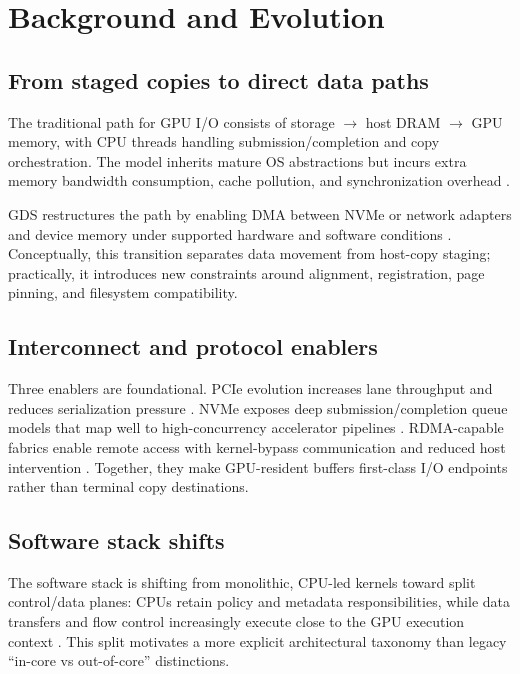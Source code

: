\section{Background and Evolution}

\subsection{From staged copies to direct data paths}

The traditional path for GPU I/O consists of storage $\rightarrow$ host DRAM $\rightarrow$ GPU memory, with CPU threads handling submission/completion and copy orchestration. The model inherits mature OS abstractions but incurs extra memory bandwidth consumption, cache pollution, and synchronization overhead \cite{linux_io_uring,spdk_overview}.

GDS restructures the path by enabling DMA between NVMe or network adapters and device memory under supported hardware and software conditions \cite{nvidia_gds_overview,nvidia_gds_best_practices}. Conceptually, this transition separates data movement from host-copy staging; practically, it introduces new constraints around alignment, registration, page pinning, and filesystem compatibility.

\subsection{Interconnect and protocol enablers}

Three enablers are foundational. PCIe evolution increases lane throughput and reduces serialization pressure \cite{pcie_spec}. NVMe exposes deep submission/completion queue models that map well to high-concurrency accelerator pipelines \cite{nvme_spec}. RDMA-capable fabrics enable remote access with kernel-bypass communication and reduced host intervention \cite{infiniband_spec}. Together, they make GPU-resident buffers first-class I/O endpoints rather than terminal copy destinations.

\subsection{Software stack shifts}

The software stack is shifting from monolithic, CPU-led kernels toward split control/data planes: CPUs retain policy and metadata responsibilities, while data transfers and flow control increasingly execute close to the GPU execution context \cite{silberstein2013gpufs,qureshi2023bam}. This split motivates a more explicit architectural taxonomy than legacy ``in-core vs out-of-core'' distinctions.
